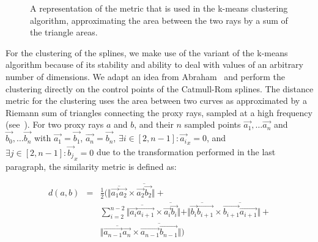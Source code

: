\begin{figure}
\centering
{}
\caption{A representation of the metric that is used in the k-means clustering algorithm, approximating the area between the two rays by a sum of the triangle areas.}
\label{contributions:fem:metric}
\end{figure}

For the clustering of the splines, we make use of the variant of the k-means~\cite{hartigan75kmeans} algorithm because of its stability and ability to deal with values of an arbitrary number of dimensions.  We adapt an idea from Abraham~\etal \cite{abraham03clustering} and perform the clustering directly on the control points of the Catmull-Rom splines.  The distance metric for the clustering uses the area between two curves as approximated by a Riemann sum of triangles connecting the proxy rays, sampled at a high frequency (see~).  For two proxy rays $a$ and $b$, and their $n$ sampled points $\vec{a_1}, \dots \vec{a_n}$ and $\vec{b_0}, \dots \vec{b_n}$ with $\vec{a_1} = \vec{b_1}$, $\vec{a_n} = \vec{b_n}$, $\exists i\in[2, n-1] : \vec{a_i}_x = 0$, and $\exists j\in[2, n-1] : \vec{b_j}_x = 0$ due to the transformation performed in the last paragraph, the similarity metric is defined as:

\begin{eqnarray}
d(a,b) &=& \frac{1}{2} \Big( \Vert \overline{\vec{a_1}\vec{a_2}} \times \overline{\vec{a_2}\vec{b_2}}\Vert + \nonumber \\
&& \sum_{i=2}^{n-2}\Vert \overline{\vec{a_i}\vec{a_{i+1}}} \times \overline{\vec{a_i}\vec{b_i}} \Vert + \Vert \overline{\vec{b_i}\vec{b_{i+1}}} \times \overline{\vec{b_{i+1}}\vec{a_{i+1}}}\Vert + \\
&& \Vert \overline{\vec{a_{n-1}}\vec{a_n}} \times \overline{\vec{a_{n-1}}\vec{b_{n-1}}}\Vert \Big) \nonumber 
\end{eqnarray}

